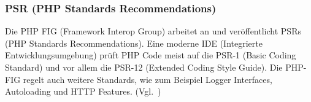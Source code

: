 \newpage

\subsubsection{PSR (PHP Standards Recommendations)}
Die PHP FIG (Framework Interop Group) arbeitet an und veröffentlicht PSRs (PHP Standards Recommendations).
Eine moderne IDE (Integrierte Entwicklungsumgebung) prüft PHP Code meist auf die PSR-1 (Basic Coding Standard) und vor allem die PSR-12 (Extended Coding Style Guide).
Die PHP-FIG regelt auch weitere Standards, wie zum Beispiel Logger Interfaces, Autoloading und HTTP Features.
(Vgl.~\cite{psr})
